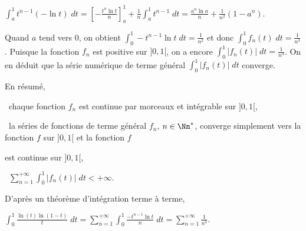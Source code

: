 {\begin{enumerate}
{\begin{center}
$\int_{a}^{1}t^{n-1}(-\ln t)\;dt=\left[-\frac{t^n\ln t}{n}\right]_a^1+\frac{1}{n}\int_{a}^{1}t^{n-1}\;dt=\frac{a^n\ln a}{n}+\frac{1}{n^2}(1-a^n)$.
\end{center}

Quand $a$ tend vers $0$, on obtient $\int_{0}^{1}-t^{n-1}\ln t\;dt=\frac{1}{n^2}$ et donc $\int_{0}^{1}f_n(t)\;dt=\frac{1}{n^3}$. Puisque la fonction $f_n$ est positive sur $]0,1[$, on a encore $\int_{0}^{1}|f_n(t)|\;dt=\frac{1}{n^3}$. On en déduit que la série numérique de terme général $\int_{0}^{1}|f_n(t)|\;dt$ converge.

En résumé,

\textbullet~chaque fonction $f_n$ est continue par morceaux et intégrable sur $]0,1[$,

\textbullet~la séries de fonctions de terme général $f_n$, $n\in\Nn^*$, converge simplement vers la fonction $f$ sur $]0,1[$ et la fonction $f$

est continue sur $]0,1[$,

\textbullet~$\sum_{n=1}^{+\infty}\int_{0}^{1}|f_n(t)|\;dt<+\infty$.

D'après un théorème d'intégration terme à terme,

\begin{center}
$\int_{0}^{1}\frac{\ln(t)\ln(1-t)}{t}\;dt=\sum_{n=1}^{+\infty}\int_{0}^{1}\frac{-t^{n-1}\ln t}{n}\;dt=\sum_{n=1}^{+\infty}\frac{1}{n^3}$.
\end{center}

\begin{center}
\end{center}}
\end{enumerate}
}